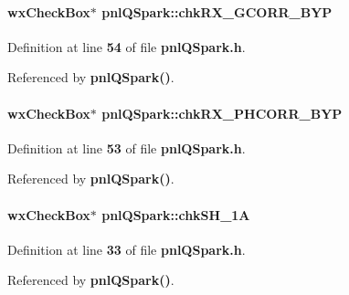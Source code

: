 \paragraph[{chk\+R\+X\+\_\+\+G\+C\+O\+R\+R\+\_\+\+B\+YP}]{\setlength{\rightskip}{0pt plus 5cm}wx\+Check\+Box$\ast$ pnl\+Q\+Spark\+::chk\+R\+X\+\_\+\+G\+C\+O\+R\+R\+\_\+\+B\+YP}\label{classpnlQSpark_aa0567dd73b4fd9e086ae2baa99b74213}


Definition at line {\bf 54} of file {\bf pnl\+Q\+Spark.\+h}.



Referenced by {\bf pnl\+Q\+Spark()}.

\paragraph[{chk\+R\+X\+\_\+\+P\+H\+C\+O\+R\+R\+\_\+\+B\+YP}]{\setlength{\rightskip}{0pt plus 5cm}wx\+Check\+Box$\ast$ pnl\+Q\+Spark\+::chk\+R\+X\+\_\+\+P\+H\+C\+O\+R\+R\+\_\+\+B\+YP}\label{classpnlQSpark_a7a3eb58b69c0809f2584cf58e65a62aa}


Definition at line {\bf 53} of file {\bf pnl\+Q\+Spark.\+h}.



Referenced by {\bf pnl\+Q\+Spark()}.

\paragraph[{chk\+S\+H\+\_\+1A}]{\setlength{\rightskip}{0pt plus 5cm}wx\+Check\+Box$\ast$ pnl\+Q\+Spark\+::chk\+S\+H\+\_\+1A}\label{classpnlQSpark_ad5af156a8127d63f4879e7d8cc357d6e}


Definition at line {\bf 33} of file {\bf pnl\+Q\+Spark.\+h}.



Referenced by {\bf pnl\+Q\+Spark()}.

